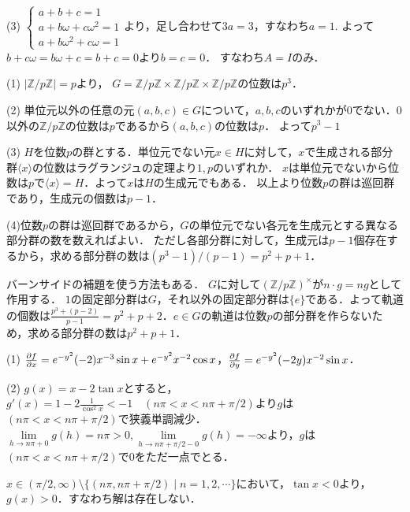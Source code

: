 \documentclass[
		book,
		head_space=20mm,
		foot_space=20mm,
		gutter=10mm,
		line_length=190mm
]{jlreq}
\begin{document}
(3) $\begin{cases}
    a+b+c=1 \\
    a+b\omega+c\omega^2=1 \\
    a+b\omega^2+c\omega=1
\end{cases} $より，足し合わせて$3a=3$，すなわち$a=1$.
よって$b+c\omega=b\omega+c= b+c=0$より$b=c=0$．
すなわち$A=I$のみ．

(1) $|\mathbb{Z}/p \mathbb{Z}|=p$より，
$G=\mathbb{Z}/p \mathbb{Z} \times \mathbb{Z}/p \mathbb{Z} \times \mathbb{Z}/p \mathbb{Z}$の位数は$p^3$．

(2)
単位元以外の任意の元$(a,b,c)\in G$について，$a,b,c$のいずれかが0でない．$0$以外の$\mathbb{Z}/p \mathbb{Z}$の位数は$p$であるから$(a,b,c)$の位数は$p$．
よって$p^3-1$

(3) $H$を位数$p$の群とする．単位元でない元$x \in H$に対して，$x$で生成される部分群$\langle x \rangle$の位数はラグランジュの定理より$1,p$のいずれか．
$x$は単位元でないから位数は$p$で$\langle x \rangle = H$．よって$x$は$H$の生成元でもある．
以上より位数$p$の群は巡回群であり，生成元の個数は$p-1$．

(4)位数$p$の群は巡回群であるから，$G$の単位元でない各元を生成元とする異なる部分群の数を数えればよい．
ただし各部分群に対して，生成元は$p-1$個存在するから，求める部分群の数は$(p^3-1)/(p-1)= p^2+p+1$．
\begin{tcolorbox}[blanker,breakable,
    left=3mm,right=3mm,
    top=3mm,bottom=3mm,
    before skip=15pt,after skip=15pt,
    borderline vertical={1pt}{0pt}{black,dotted}]
    バーンサイドの補題を使う方法もある．
    $G$に対して$(\mathbb{Z}/p \mathbb{Z})^{\times}$が$n \cdot g= ng$として作用する．
    $1$の固定部分群は$G$，それ以外の固定部分群は$\{e\}$である．よって軌道の個数は$\frac{p^3+(p-2)}{p-1}=p^2+p+2$．$e\in G$の軌道は位数$p$の部分群を作らないため，求める部分群の数は$p^2+p+1$．
    \end{tcolorbox}

(1) $\pdv{f}{x}=e^{-y^2}(-2)x^{-3}\sin x + e^{-y^2}x^{-2}\cos x$，$\pdv{f}{y}=e^{-y^2}(-2y)x^{-2}\sin x$．

(2) $g(x)=x-2\tan x$とすると，
$g'(x)=1-2\frac{1}{\cos^2 x}<-1\quad(n\pi < x <n\pi+\pi/2)$より$g$は$(n\pi < x <n\pi+\pi/2)$で狭義単調減少．
$\lim\limits_{h\to n\pi+0}g(h)=n\pi>0, \lim\limits_{h\to n\pi+\pi/2-0}g(h)=-\infty$より，$g$は$(n\pi < x <n\pi+\pi/2)$で$0$をただ一点でとる．

$x \in (\pi/2,\infty) \setminus \{(n\pi,n\pi+\pi/2) \mid n=1,2,\cdots\}$において，$\tan x <0$より，$g(x)>0$．すなわち解は存在しない．
\end{document}
